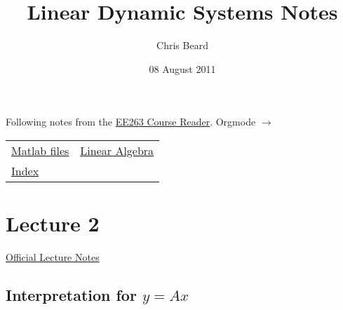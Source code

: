 \documentclass[10pt,letterpaper]{article}
\begin{document}
\title{Linear Dynamic Systems Notes}
\author{Chris Beard}
\date{08 August 2011}
\maketitle

\setcounter{tocdepth}{3}
\tableofcontents
\vspace*{1cm}
Following notes from the \href{file://.~/Desktop/Engineering/kiet-ee-downloads/current/ee263_course_reader.pdf}{EE263 Course Reader}. Orgmode $\rightarrow$ \LaTeXe

\begin{center}
\begin{tabular}{ll}
 \href{http://www.stanford.edu/~boyd/ee263/matlab/}{Matlab files}                                       &  \href{file:///Users/FingerMan/Dropbox/AK-MBP/edu/systems/linear-algebra-notes.pdf}{Linear Algebra}  \\
 \href{file:///Users/FingerMan/Dropbox/AK-MBP/edu/systems/IntroToLinearDynamicalSys/index.html}{Index}  &                                                                                                      \\
\end{tabular}
\end{center}


\section{Lecture 2}
\label{sec-1}

\href{file:///Users/FingerMan/Dropbox/AK-MBP/edu/systems/IntroToLinearDynamicalSys/materials/lsoeldsee263/02-lin-fcts.pdf}{Official Lecture Notes}
\subsection{Interpretation for $y=Ax$}
\label{sec-1_1}
\end{document}
